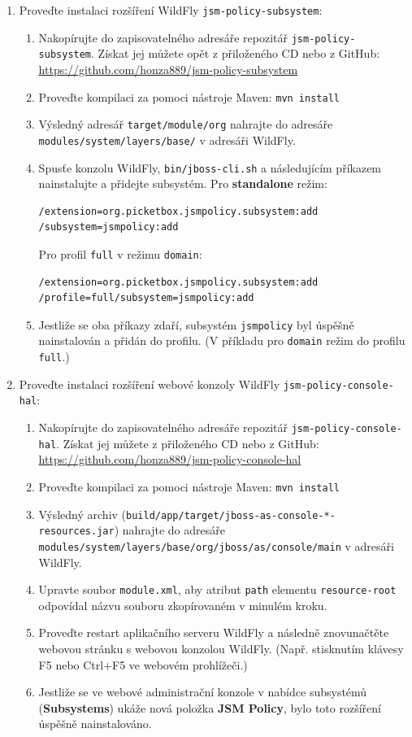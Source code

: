 \begin{enumerate}
  \item Proveďte instalaci rozšíření WildFly {\tt jsm-policy-subsystem}:
  \begin{enumerate}
    \item Nakopírujte do zapisovatelného adresáře repozitář {\tt jsm-policy-subsystem}. Získat jej můžete opět z přiloženého CD nebo z GitHub:
      \newline\url{https://github.com/honza889/jsm-policy-subsystem}
    \item Proveďte kompilaci za pomoci nástroje Maven: {\tt mvn install}
    \item Výsledný adresář {\tt target/module/org} nahrajte do adresáře {\tt modules/system/la\linebreak yers/base/} v adresáři WildFly.
    \item Spusťe konzolu WildFly, {\tt bin/jboss-cli.sh} a následujícím příkazem nainstalujte a přidejte subsystém. Pro {\bf standalone} režim:
      \begin{lstlisting}
/extension=org.picketbox.jsmpolicy.subsystem:add
/subsystem=jsmpolicy:add
      \end{lstlisting}
      Pro profil {\tt full} v režimu {\tt domain}:
      \begin{lstlisting}
/extension=org.picketbox.jsmpolicy.subsystem:add
/profile=full/subsystem=jsmpolicy:add
      \end{lstlisting}
    \item Jestliže se oba příkazy zdaří, subsystém {\tt jsmpolicy} byl úspěšně nainstalován a přidán do profilu. (V příkladu pro {\tt domain} režim do profilu {\tt full}.)
  \end{enumerate}
  
  \item Proveďte instalaci rozšíření webové konzoly WildFly {\tt jsm-policy-console-hal}:
  \begin{enumerate}
    \item Nakopírujte do zapisovatelného adresáře repozitář {\tt jsm-policy-console-hal}. Získat jej můžete z přiloženého CD nebo z GitHub:
      \newline\url{https://github.com/honza889/jsm-policy-console-hal}
    \item Proveďte kompilaci za pomoci nástroje Maven: {\tt mvn install}
    \item Výsledný archiv ({\tt build/app/target/jboss-as-console-*-resources.jar}) nahrajte do adresáře {\tt modules/system/layers/base/org/jboss/as/console/main} v adresáři WildFly.
    \item Upravte soubor {\tt module.xml}, aby atribut {\tt path} elementu {\tt resource-root} odpovídal názvu souboru zkopírovaném v minulém kroku.
    \item Proveďte restart aplikačního serveru WildFly a následně znovunačtěte webovou stránku s webovou konzolou WildFly. (Např. stisknutím klávesy F5 nebo Ctrl+F5 ve webovém prohlížeči.)
    \item Jestliže se ve webové administrační konzole v nabídce subsystémů ({\bf Subsystems}) ukáže nová položka {\bf JSM Policy}, bylo toto rozšíření úspěšně nainstalováno.
  \end{enumerate}
  

\end{enumerate}
